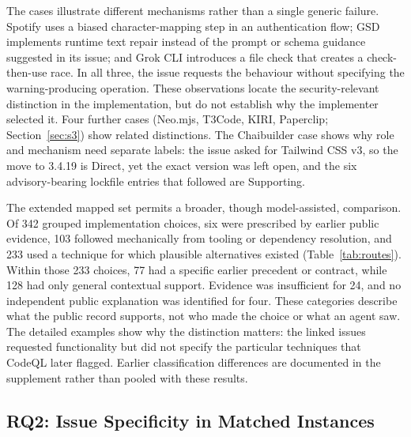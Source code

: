 \documentclass[acmsmall,screen,nonacm]{acmart}
\begin{document}
The cases illustrate different mechanisms rather than a single generic failure. Spotify uses a biased character-mapping step in an authentication flow; GSD implements runtime text repair instead of the prompt or schema guidance suggested in its issue; and Grok CLI introduces a file check that creates a check-then-use race. In all three, the issue requests the behaviour without specifying the warning-producing operation. These observations locate the security-relevant distinction in the implementation, but do not establish why the implementer selected it. Four further cases (Neo.mjs, T3Code, KIRI, Paperclip; Section~\ref{sec:s3}) show related distinctions. The Chaibuilder case shows why role and mechanism need separate labels: the issue asked for Tailwind CSS v3, so the move to 3.4.19 is Direct, yet the exact version was left open, and the six advisory-bearing lockfile entries that followed are Supporting.

The extended mapped set permits a broader, though model-assisted, comparison. Of 342 grouped implementation choices, six were prescribed by earlier public evidence, 103 followed mechanically from tooling or dependency resolution, and 233 used a technique for which plausible alternatives existed (Table~\ref{tab:routes}). Within those 233 choices, 77 had a specific earlier precedent or contract, while 128 had only general contextual support. Evidence was insufficient for 24, and no independent public explanation was identified for four. These categories describe what the public record supports, not who made the choice or what an agent saw. The detailed examples show why the distinction matters: the linked issues requested functionality but did not specify the particular techniques that CodeQL later flagged. Earlier classification differences are documented in the supplement rather than pooled with these results.

\subsection{RQ2: Issue Specificity in Matched Instances}\label{sec:rq2-res}
\end{document}
